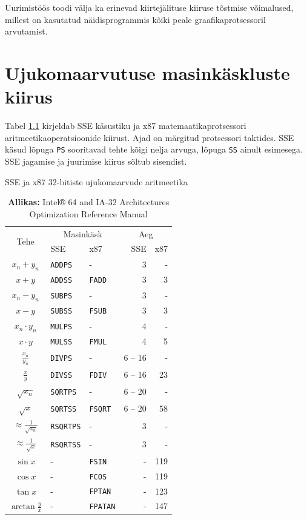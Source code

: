 \documentclass[a4paper,12pt]{report}
\begin{document}
Uurimistöös toodi välja ka erinevad kiirtejälituse kiiruse tõstmise
võimalused, millest on kasutatud näidisprogrammis kõiki peale
graafikaprotsessoril arvutamist.

\renewcommand\bibname{Kasutatud materjalid}



\appendix
\chapter{Ujukomaarvutuse masinkäskluste kiirus}
\label{chap:fpspeed}
Tabel \ref{table:fpspeed} kirjeldab SSE käsustiku ja x87 matemaatikaprotsessori
aritmeetikaoperatsioonide kiirust. Ajad on märgitud protsessori taktides.
SSE käsud lõpuga \texttt{PS} sooritavad tehte kõigi nelja arvuga, lõpuga
\texttt{SS} ainult esimesega. SSE jagamise ja juurimise kiirus sõltub sisendist.

\begin{table}[h]
\caption{SSE ja x87 32-bitiste ujukomaarvude aritmeetika}
\label{table:fpspeed}
\vspace{-15pt}
\caption*{\textbf{Allikas:} Intel® 64 and IA-32 Architectures Optimization Reference Manual}
\vspace{-20pt}
\begin{center}
\begin{tabular}{|c|l|l|r|r|}
\hline
\multirow{2}{*}{Tehe} & \multicolumn{2}{|c|}{Masinkäsk} & \multicolumn{2}{|c|}{Aeg} \\
\cline{2-5}
& SSE & x87 & SSE & x87 \\
\hline
\(x_n + y_n\) & \texttt{ADDPS} & - & 3 & -\\
\(x + y\) & \texttt{ADDSS} & \texttt{FADD} & 3 & 3\\
\(x_n - y_n\) & \texttt{SUBPS} & - & 3 & -\\
\(x - y\) & \texttt{SUBSS} & \texttt{FSUB} & 3 & 3\\
\(x_n \cdot y_n\) & \texttt{MULPS} & - & 4 & -\\
\(x \cdot y\) & \texttt{MULSS} & \texttt{FMUL} & 4 & 5\\
\(\frac{x_n}{y_n}\) & \texttt{DIVPS} & - & 6 -- 16 & -\\
\(\frac x y\) & \texttt{DIVSS} & \texttt{FDIV} & 6 -- 16 & 23 \\
\(\sqrt{x_n}\) & \texttt{SQRTPS} & - & 6 -- 20 & -\\
\(\sqrt x\) & \texttt{SQRTSS} & \texttt{FSQRT} &  6 -- 20 & 58 \\
\(\approx\frac1{\sqrt{x_n}}\) & \texttt{RSQRTPS} & - & 3 & - \\
\(\approx\frac1{\sqrt x}\)& \texttt{RSQRTSS} & - & 3 & - \\
\(\sin x\) & - & \texttt{FSIN} & - & 119 \\
\(\cos x\) & - & \texttt{FCOS} & - & 119 \\
\(\tan x\) & - & \texttt{FPTAN} & - & 123 \\
\(\arctan \frac{y}{x}\) & - & \texttt{FPATAN} & - & 147 \\
\hline
\end{tabular}
\end{center}
\vspace{-20pt}
\end{table}
\end{document}
